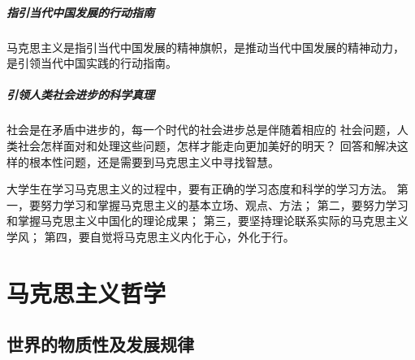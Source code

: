 \documentclass[10pt, UTF8]{book} %
\begin{document}
\subsubsection{指引当代中国发展的行动指南}
马克思主义是指引当代中国发展的精神旗帜，是推动当代中国发展的精神动力，
是引领当代中国实践的行动指南。
\subsubsection{引领人类社会进步的科学真理}
社会是在矛盾中进步的，每一个时代的社会进步总是伴随着相应的
社会问题，人类社会怎样面对和处理这些问题，怎样才能走向更加美好的明天？
回答和解决这样的根本性问题，还是需要到马克思主义中寻找智慧。

\vspace*{1em}
大学生在学习马克思主义的过程中，要有正确的学习态度和科学的学习方法。
第一，要努力学习和掌握马克思主义的基本立场、观点、方法；
第二，要努力学习和掌握马克思主义中国化的理论成果；
第三，要坚持理论联系实际的马克思主义学风；
第四，要自觉将马克思主义内化于心，外化于行。

\clearpage
\thispagestyle{empty}
\mainmatter

\part{马克思主义哲学}

\chapter{世界的物质性及发展规律}




\end{document}
